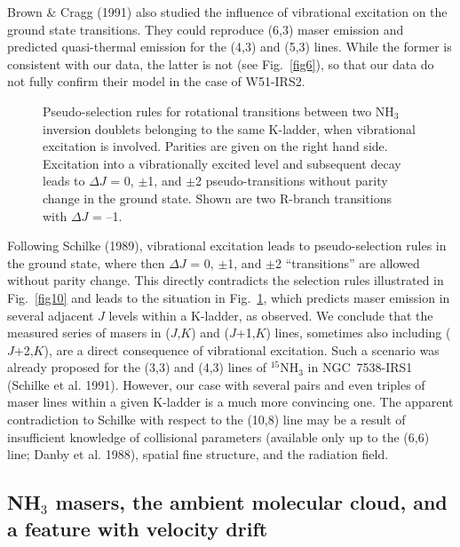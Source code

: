 \documentclass[oldversion]{aa}
\begin{document}
Brown \& Cragg (1991) also studied the influence of vibrational
excitation on the ground state transitions. They could 
reproduce (6,3) maser emission and predicted quasi-thermal 
emission for the (4,3) and (5,3) lines. While the former is
consistent with our data, the latter is not (see Fig.~\ref{fig6}),
so that our data do not fully confirm their model in the case of 
W51-IRS2.


\begin{figure}[t]
\vspace{0.0cm}
\centering
{}
\vspace{-0.0cm}
\caption{Pseudo-selection rules for rotational transitions between two NH$_3$ inversion 
doublets belonging to the same K-ladder, when vibrational excitation is involved. 
Parities are given on the right hand side. Excitation into a vibrationally excited 
level and subsequent decay leads to $\Delta$$J$ = 0, $\pm$1, and $\pm$2 pseudo-transitions
without parity change in the ground state. Shown are two R-branch transitions with 
$\Delta$$J$ = --1.
\label{fig11}}
\end{figure}


Following Schilke (1989), vibrational excitation leads to 
pseudo-selection rules in the ground state, where then $\Delta 
J$ = 0, $\pm$1, and $\pm$2 ``transitions'' are allowed without 
parity change. This directly contradicts the selection rules 
illustrated in Fig.~\ref{fig10} and leads to the situation in 
Fig.~\ref{fig11}, which predicts maser emission in several
adjacent $J$ levels within a K-ladder, as observed. We conclude 
that the measured series of masers in ($J$,$K$) and ($J$+1,$K$) 
lines, sometimes also including ($J$+2,$K$), are a direct 
consequence of vibrational excitation. Such a scenario was 
already proposed for the (3,3) and (4,3) lines of $^{15}$NH$_3$ 
in NGC~7538-IRS1 (Schilke et al. 1991). However, our case with 
several pairs and even triples of maser lines within a given 
K-ladder is a much more convincing one. The apparent contradiction
to Schilke with respect to the (10,8) line may be a result
of insufficient knowledge of collisional parameters (available
only up to the (6,6) line; Danby et al. 1988), spatial fine
structure, and the radiation field.


\subsection{NH$_3$ masers, the ambient molecular cloud, and a
feature with velocity drift}
\end{document}
